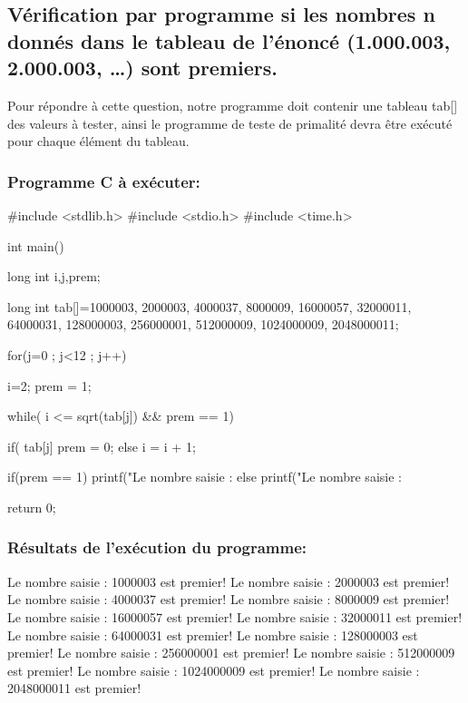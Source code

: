 \documentclass[12pt]{article}
\begin{document}
\subsection{Vérification par programme  si  les  nombres  n  donnés  dans  le tableau de l'énoncé (1.000.003, 2.000.003, …) sont premiers.}

Pour répondre à cette question, notre programme doit contenir une tableau tab[] des valeurs à tester, ainsi le programme de teste de primalité devra être exécuté pour chaque élément du tableau.

\subsubsection{Programme C à exécuter:}

\begin{sql}
#include <stdlib.h>
#include <stdio.h>
#include <time.h>

int main()
{
	long int i,j,prem;

	long int tab[]={1000003, 2000003, 4000037, 8000009, 16000057, 32000011, 64000031, 128000003, 256000001, 512000009,	1024000009,	2048000011};

for(j=0 ; j<12 ; j++)
{
	i=2;
	prem = 1;
	
	while( i <= sqrt(tab[j]) && prem == 1){

		if( tab[j]%
			prem = 0;
		else
			i = i + 1;
	}

	if(prem == 1)
    {
        printf("Le nombre saisie : %
    }
	else{
        printf("Le nombre saisie : %
	}
}

return 0;
}
\end{sql}

\subsubsection{Résultats de l'exécution du programme:}
\begin{sql}
Le nombre saisie : 1000003 est premier!
Le nombre saisie : 2000003 est premier!
Le nombre saisie : 4000037 est premier!
Le nombre saisie : 8000009 est premier!
Le nombre saisie : 16000057 est premier!
Le nombre saisie : 32000011 est premier!
Le nombre saisie : 64000031 est premier!
Le nombre saisie : 128000003 est premier!
Le nombre saisie : 256000001 est premier!
Le nombre saisie : 512000009 est premier!
Le nombre saisie : 1024000009 est premier!
Le nombre saisie : 2048000011 est premier!
\end{sql}
\end{document}
